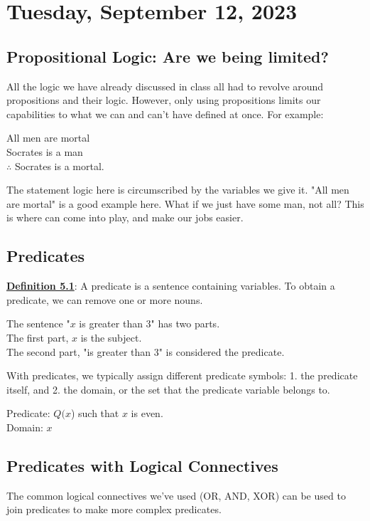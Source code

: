 \section{Tuesday, September 12, 2023}
\subsection{Propositional Logic: Are we being limited?}
All the logic we have already discussed in class all had to revolve around propositions and their logic. However, only using propositions limits our capabilities to what we can and can't have defined at once. For example:

\begin{center}
    All men are mortal \\
    Socrates is a man \\
    $\therefore$ Socrates is a mortal.
\end{center}

The statement logic here is circumscribed by the variables we give it. "All men are mortal" is a good example here. What if we just have some man, not all? This is where  can come into play, and make our jobs easier.

\subsection{Predicates}
\textbf{\underline{Definition 5.1}}: A predicate is a sentence containing variables. To obtain a predicate, we can remove one or more nouns.

\begin{example}
    The sentence "\(x\) is greater than 3" has two parts.\\
    The first part, \(x\) is the subject. \\
    The second part, "is greater than 3" is considered the predicate.
\end{example}

With predicates, we typically assign different predicate symbols: 1. the predicate itself, and 2. the domain, or the set that the predicate variable belongs to.

\begin{example}
    Predicate: \(Q(x\)) such that \(x\) is even. \\
    Domain: \(x\) \in {}
\end{example}

\subsection{Predicates with Logical Connectives}
The common logical connectives we've used (OR, AND, XOR) can be used to join predicates to make more complex predicates.

